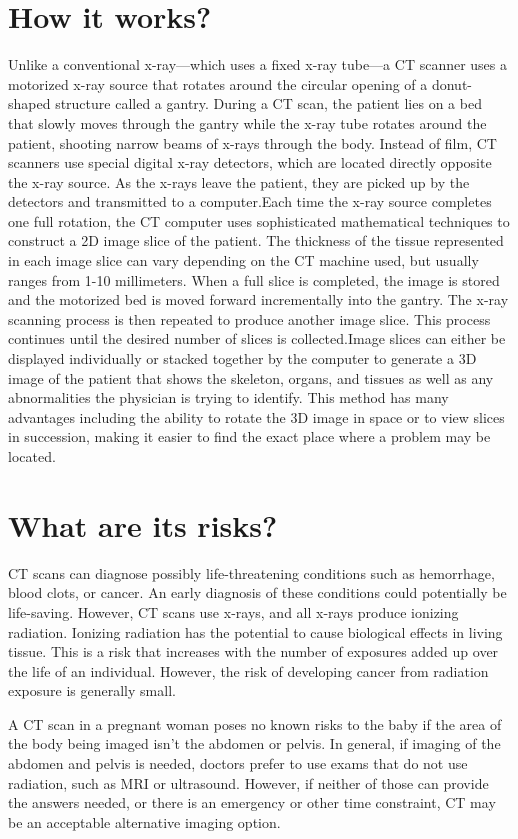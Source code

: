\documentclass[a4paper,12pt]{report}
\begin{document}
\section{How it works?}
Unlike a conventional x-ray—which uses a fixed x-ray tube—a CT scanner uses a motorized x-ray source that rotates around the circular opening of a donut-shaped structure called a gantry. During a CT scan, the patient lies on a bed that slowly moves through the gantry while the x-ray tube rotates around the patient, shooting narrow beams of x-rays through the body. Instead of film, CT scanners use special digital x-ray detectors, which are located directly opposite the x-ray source. As the x-rays leave the patient, they are picked up by the detectors and transmitted to a computer.Each time the x-ray source completes one full rotation, the CT computer uses sophisticated mathematical techniques to construct a 2D image slice of the patient. The thickness of the tissue represented in each image slice can vary depending on the CT machine used, but usually ranges from 1-10 millimeters. When a full slice is completed, the image is stored and the motorized bed is moved forward incrementally into the gantry. The x-ray scanning process is then repeated to produce another image slice. This process continues until the desired number of slices is collected.Image slices can either be displayed individually or stacked together by the computer to generate a 3D image of the patient that shows the skeleton, organs, and tissues as well as any abnormalities the physician is trying to identify. This method has many advantages including the ability to rotate the 3D image in space or to view slices in succession, making it easier to find the exact place where a problem may be located.
\section{What are its risks?}
CT scans can diagnose possibly life-threatening conditions such as hemorrhage, blood clots, or cancer. An early diagnosis of these conditions could potentially be life-saving. However, CT scans use x-rays, and all x-rays produce ionizing radiation. Ionizing radiation has the potential to cause biological effects in living tissue. This is a risk that increases with the number of exposures added up over the life of an individual. However, the risk of developing cancer from radiation exposure is generally small.

A CT scan in a pregnant woman poses no known risks to the baby if the area of the body being imaged isn’t the abdomen or pelvis. In general, if imaging of the abdomen and pelvis is needed, doctors prefer to use exams that do not use radiation, such as MRI or ultrasound. However, if neither of those can provide the answers needed, or there is an emergency or other time constraint, CT may be an acceptable alternative imaging option.
\end{document}
